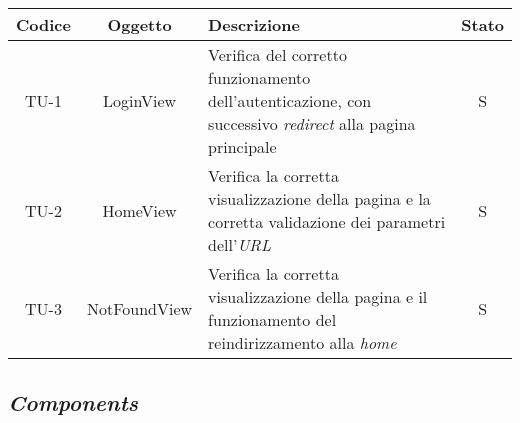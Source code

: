 \begin{center}
  \label{tab:test-unita-views}
  \begin{longtable}{|c|c|p{}|c|}
  \hline
  \textbf{Codice} & \textbf{Oggetto} & \textbf{Descrizione} & \textbf{Stato}\\
  \hline
  TU-1 &LoginView &Verifica del corretto funzionamento dell'au\-ten\-ti\-ca\-zio\-ne, con successivo \textit{redirect} alla pagina principale &S \\
  \hline
  TU-2 &HomeView &Verifica la corretta visualizzazione della pa\-gi\-na e la corretta validazione dei parametri dell'\textit{URL} &S \\
  \hline
  TU-3 &NotFoundView &Verifica la corretta visualizzazione della pa\-gi\-na e il funzionamento del reindirizzamento alla \textit{home} &S \\
  \hline
\end{longtable}
\end{center}

\subsection*{\emph{Components}}\label{subsec:test-unita-components}

